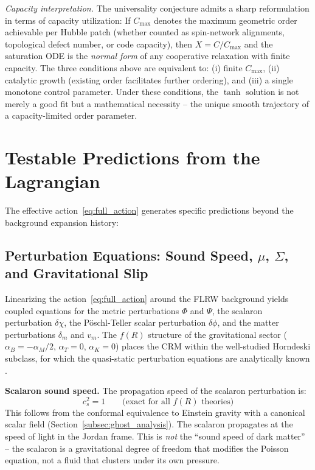 \documentclass[aps,prd,twocolumn,superscriptaddress,nofootinbib]{revtex4-2}
\begin{document}
\textit{Capacity interpretation.} The universality conjecture admits a sharp reformulation in terms of capacity utilization: If $C_{\max}$ denotes the maximum geometric order achievable per Hubble patch (whether counted as spin-network alignments, topological defect number, or code capacity), then $X = C/C_{\max}$ and the saturation ODE is the \textit{normal form} of any cooperative relaxation with finite capacity. The three conditions above are equivalent to: (i) finite $C_{\max}$, (ii) catalytic growth (existing order facilitates further ordering), and (iii) a single monotone control parameter. Under these conditions, the $\tanh$ solution is not merely a good fit but a mathematical necessity -- the unique smooth trajectory of a capacity-limited order parameter.


\section{Testable Predictions from the Lagrangian}
\label{sec:predictions}

The effective action~\eqref{eq:full_action} generates specific predictions beyond the background expansion history:

\subsection{Perturbation Equations: Sound Speed, $\mu$, $\Sigma$, and Gravitational Slip}
\label{subsec:perturbation_physics}

Linearizing the action~\eqref{eq:full_action} around the FLRW background yields coupled equations for the metric perturbations $\Phi$ and $\Psi$, the scalaron perturbation $\delta\chi$, the P\"oschl-Teller scalar perturbation $\delta\phi$, and the matter perturbations $\delta_m$ and $v_m$. The $f(R)$ structure of the gravitational sector ($\alpha_B = -\alpha_M/2$, $\alpha_T = 0$, $\alpha_K = 0$) places the CRM within the well-studied Horndeski subclass, for which the quasi-static perturbation equations are analytically known \cite{Bellini2014}.

\textbf{Scalaron sound speed.} The propagation speed of the scalaron perturbation is:
\begin{equation}
c_s^2 = 1 \qquad \text{(exact for all $f(R)$ theories)}
\end{equation}
This follows from the conformal equivalence to Einstein gravity with a canonical scalar field (Section~\ref{subsec:ghost_analysis}). The scalaron propagates at the speed of light in the Jordan frame. This is \textit{not} the ``sound speed of dark matter'' -- the scalaron is a gravitational degree of freedom that modifies the Poisson equation, not a fluid that clusters under its own pressure.
\end{document}
